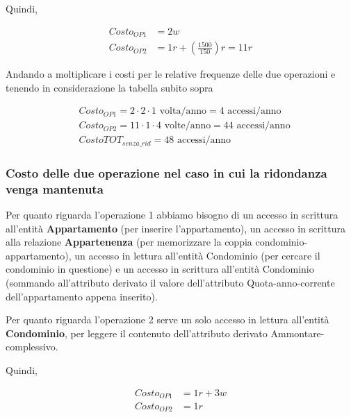 Quindi,

\begin{samepage}
    \begin{align*}
        Costo_{OP1} &= 2w \\
        Costo_{OP2} &= 1r + \left(\frac{1500}{150}\right)r = 11r
    \end{align*}
\end{samepage}

Andando a moltiplicare i costi per le relative frequenze delle due operazioni e tenendo in considerazione la tabella subito sopra

\begin{samepage}
    \begin{align*}
        &Costo_{OP1} = 2 \cdot 2 \cdot 1 \text{ volta/anno} = 4 \text{ accessi/anno} \\
        &Costo_{OP2} = 11 \cdot 1 \cdot 4 \text{ volte/anno} = 44 \text{ accessi/anno} \\
        &CostoTOT_{senza\_rid} = 48 \text{ accessi/anno}
    \end{align*}
\end{samepage}

\subsubsection{Costo delle due operazione nel caso in cui la ridondanza venga mantenuta}

Per quanto riguarda l'operazione 1 abbiamo bisogno di un accesso in scrittura all'entità \textbf{Appartamento} (per inserire l'appartamento), un accesso in scrittura alla relazione \textbf{Appartenenza} (per memorizzare la coppia condominio-appartamento), un accesso in lettura all'entità Condominio (per cercare il condominio in questione) e un accesso in scrittura all'entità Condominio (sommando all'attributo derivato il valore dell'attributo Quota-anno-corrente dell'appartamento appena inserito).

Per quanto riguarda l'operazione 2 serve un solo accesso in lettura all'entità \textbf{Condominio}, per leggere il contenuto dell'attributo derivato Ammontare-complessivo.

Quindi,

\begin{samepage}
	\begin{align*}
		Costo_{OP1} &= 1r + 3w \\
		Costo_{OP2} &= 1r
    \end{align*}
\end{samepage}

